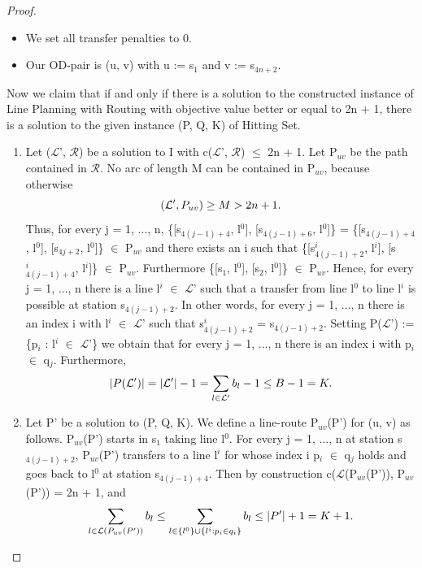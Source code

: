 \documentclass[
  twoside,
  11pt, a4paper,
  footinclude=true,
  headinclude=true,
  cleardoublepage=empty
]{book}
\theoremstyle{definition}
\begin{document}
\begin{proof}
\begin{itemize}
\item We set all transfer penalties to 0.
\item Our OD-pair is (u, v) with u := s$_1$ and v := s$_{4n+2}$. 
\end{itemize}
Now we claim that if and only if there is a solution to the constructed instance of Line Planning with Routing with objective value better or equal to 2n + 1, there is a solution to the given instance (P, Q, K) of Hitting Set.
\begin{enumerate}
\item Let ($\mathcal{L}$', $\mathcal{R}$) be a solution to I with c($\mathcal{L}$', $\mathcal{R}$) $\le$ 2n + 1. Let P$_{uv}$ be the path contained in $\mathcal{R}$. No arc of length M can be contained in P$_{uv}$, because otherwise
\begin{equation} \notag
(\mathcal{L}', P_{uv}) \ge M > 2n + 1.
\end{equation}
Thus, for every j = 1, ..., n, \{[s$_{4(j-1)+4}$, l$^0$], [s$_{4(j-1)+6}$, l$^0$]\} = \{[s$_{4(j-1)+4}$, l$^0$], [s$_{4j+2}$, l$^0$]\} $\in$ P$_{uv}$ and there exists an i such that \{[s$^i_{4(j-1)+2}$, l$^i$], [s$^i_{4(j-1)+4}$, l$^i$]\} $\in$ P$_{uv}$. Furthermore \{[s$_1$, l$^0$], [s$_2$, l$^0$]\} $\in$ P$_{uv}$.
Hence, for every j = 1, ..., n there is a line l$^i$ $\in$ $\mathcal{L}$' such that a transfer from line l$^0$ to line l$^i$ is possible at station s$_{4(j-1)+2}$. In other words, for every j = 1, ..., n there is an index i with l$^i$ $\in$ $\mathcal{L}$' such that s$^i_{4(j-1)+2}$ = s$_{4(j-1)+2}$. \newline
Setting P($\mathcal{L}$') := \{p$_i$ : l$^i$ $\in$ $\mathcal{L}$'\} we obtain that for every j = 1, ..., n there is an index i with p$_i$ $\in$ q$_j$. Furthermore,
\begin{equation} \notag
|P(\mathcal{L}')| = |\mathcal{L}'| - 1 = \sum_{l \in \mathcal{L}'} b_l - 1 \le B - 1 = K.
\end{equation}
\item Let P' be a solution to (P, Q, K). We define a line-route P$_{uv}$(P') for (u, v) as follows. P$_{uv}$(P') starts in s$_1$ taking line l$^0$. For every j = 1, ..., n at station s$_{4(j-1)+2}$, P$_{uv}$(P') transfers to a line l$^i$ for whose index i p$_i$ $\in$ q$_j$ holds and goes back to l$^0$ at station s$_{4(j-1)+4}$. \newline
Then by construction c($\mathcal{L}$(P$_{uv}$(P')), P$_{uv}$(P')) = 2n + 1, and
\begin{equation} \notag
\sum_{l\in\mathcal{L}(P_{uv}(P'))} b_l \le \sum_{l\in\{l^0\}\cup\{l^i:p_i\in q_i\}} b_l \le |P'| + 1 = K + 1.
\end{equation}
\end{enumerate} 
\end{proof} 
\end{document}
